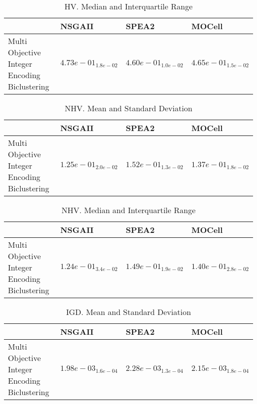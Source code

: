 \documentclass{article}
\begin{document}
\begin{table}
\caption{HV. Median and Interquartile Range}
\label{table: HV}
\centering
\begin{scriptsize}
\begin{tabular}{llll}
\hline & NSGAII & SPEA2 &  MOCell\\
\hline 
Multi Objective Integer Encoding Biclustering & \cellcolor{gray95}$  4.73e-01_{ 1.8e-02}$ & $  4.60e-01_{ 1.0e-02}$ & \cellcolor{gray25}$  4.65e-01_{ 1.5e-02}$ \\
\hline
\end{tabular}
\end{scriptsize}
\end{table}

\begin{table}
\caption{NHV. Mean and Standard Deviation}
\label{table: NHV}
\centering
\begin{scriptsize}
\begin{tabular}{llll}
\hline & NSGAII & SPEA2 &  MOCell\\
\hline 
Multi Objective Integer Encoding Biclustering & \cellcolor{gray95}$  1.25e-01_{ 2.0e-02}$ & $  1.52e-01_{ 1.3e-02}$ & \cellcolor{gray25}$  1.37e-01_{ 1.8e-02}$ \\
\hline
\end{tabular}
\end{scriptsize}
\end{table}

\begin{table}
\caption{NHV. Median and Interquartile Range}
\label{table: NHV}
\centering
\begin{scriptsize}
\begin{tabular}{llll}
\hline & NSGAII & SPEA2 &  MOCell\\
\hline 
Multi Objective Integer Encoding Biclustering & \cellcolor{gray95}$  1.24e-01_{ 3.4e-02}$ & $  1.49e-01_{ 1.9e-02}$ & \cellcolor{gray25}$  1.40e-01_{ 2.8e-02}$ \\
\hline
\end{tabular}
\end{scriptsize}
\end{table}

\begin{table}
\caption{IGD. Mean and Standard Deviation}
\label{table: IGD}
\centering
\begin{scriptsize}
\begin{tabular}{llll}
\hline & NSGAII & SPEA2 &  MOCell\\
\hline 
Multi Objective Integer Encoding Biclustering & \cellcolor{gray95}$  1.98e-03_{ 1.6e-04}$ & $  2.28e-03_{ 1.3e-04}$ & \cellcolor{gray25}$  2.15e-03_{ 1.8e-04}$ \\
\hline
\end{tabular}
\end{scriptsize}
\end{table}
\end{document}
